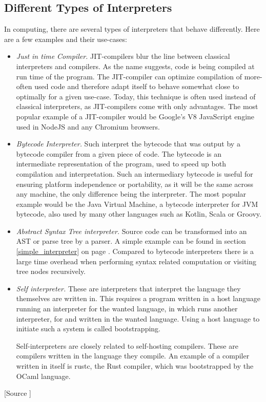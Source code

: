 \documentclass[12pt,a4paper]{article}
\begin{document}
\subsection{Different Types of Interpreters}
In computing, there are several types of interpreters that behave differently.
Here are a few examples and their use-cases:
\begin{itemize}
    \item \emph{Just in time Compiler.} JIT-compilers blur the line between
        classical interpreters and compilers. As the name suggests, code is
        being compiled at run time of the program. The JIT-compiler can optimize
        compilation of more-often used code and therefore adapt itself to
        behave somewhat close to optimally for a given use-case. Today, this 
        technique is often used instead of classical interpreters, as
        JIT-compilers come with only advantages. The most popular example of
        a JIT-compiler would be Google's V8 JavaScript engine used
        in NodeJS and any Chromium browsers.
    \item \emph{Bytecode Interpreter.} Such interpret the bytecode that was
        output by a bytecode compiler from a given piece of code. The bytecode
        is an intermediate representation of the program, used to speed up
        both compilation and interpretation. Such an intermediary bytecode is
        useful for ensuring platform independence or portability, as it will be
        the same across any machine, the only difference being the interpreter.
        The most popular example would be the Java Virtual Machine,
        a bytecode interpreter for JVM bytecode, also used by many other languages
        such as Kotlin, Scala or Groovy.
    \item \emph{Abstract Syntax Tree interpreter.} Source code can be
        transformed into an AST or parse tree by a parser. A simple example
        can be found in section \ref{simple_interpreter}
        on page \pageref{simple_interpreter}. Compared to bytecode interpreters
        there is a large time overhead when performing syntax related computation
        or visiting tree nodes recursively.
    \item \emph{Self interpreter.} These are interpreters that interpret the
        language they themselves are written in. This requires a program
        written in a host language running an interpreter for the wanted
        language, in which runs another interpreter, for and written in the
        wanted language. Using a host language to initiate such a system is called
        bootstrapping.

        Self-interpreters are closely related to self-hosting compilers. These
        are compilers written in the language they compile.
        An example of a compiler written in itself is rustc, the Rust
        compiler, which was bootstrapped by the OCaml language.
\end{itemize}
[Source ]
\end{document}
